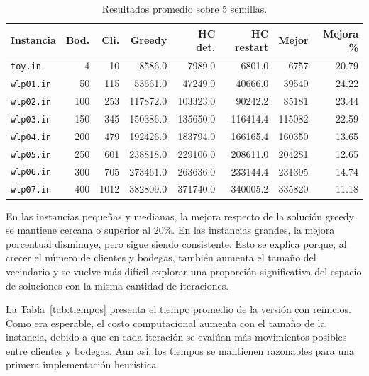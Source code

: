 \begin{table}[H]
\centering
\caption{Resultados promedio sobre 5 semillas.}
\label{tab:resultados-generales}
\begin{tabular}{lrrrrrrr}
\toprule
Instancia & Bod. & Cli. & Greedy & HC det. & HC restart & Mejor & Mejora \% \\
\midrule
\texttt{toy.in}   & 4   & 10   & 8586.0   & 7989.0   & 6801.0   & 6757   & 20.79 \\
\texttt{wlp01.in} & 50  & 115  & 53661.0  & 47249.0  & 40666.0  & 39540  & 24.22 \\
\texttt{wlp02.in} & 100 & 253  & 117872.0 & 103323.0 & 90242.2  & 85181  & 23.44 \\
\texttt{wlp03.in} & 150 & 345  & 150386.0 & 135650.0 & 116414.4 & 115082 & 22.59 \\
\texttt{wlp04.in} & 200 & 479  & 192426.0 & 183794.0 & 166165.4 & 160350 & 13.65 \\
\texttt{wlp05.in} & 250 & 601  & 238818.0 & 229106.0 & 208611.0 & 204281 & 12.65 \\
\texttt{wlp06.in} & 300 & 705  & 273461.0 & 263636.0 & 233144.4 & 231395 & 14.74 \\
\texttt{wlp07.in} & 400 & 1012 & 382809.0 & 371740.0 & 340005.2 & 335820 & 11.18 \\
\bottomrule
\end{tabular}
\end{table}

\noindent En las instancias pequeñas y medianas, la mejora respecto de la solución greedy se mantiene cercana o superior al \(20\%\). En las instancias grandes, la mejora porcentual disminuye, pero sigue siendo consistente. Esto se explica porque, al crecer el número de clientes y bodegas, también aumenta el tamaño del vecindario y se vuelve más difícil explorar una proporción significativa del espacio de soluciones con la misma cantidad de iteraciones.

\noindent La Tabla~\ref{tab:tiempos} presenta el tiempo promedio de la versión con reinicios. Como era esperable, el costo computacional aumenta con el tamaño de la instancia, debido a que en cada iteración se evalúan más movimientos posibles entre clientes y bodegas. Aun así, los tiempos se mantienen razonables para una primera implementación heurística.

